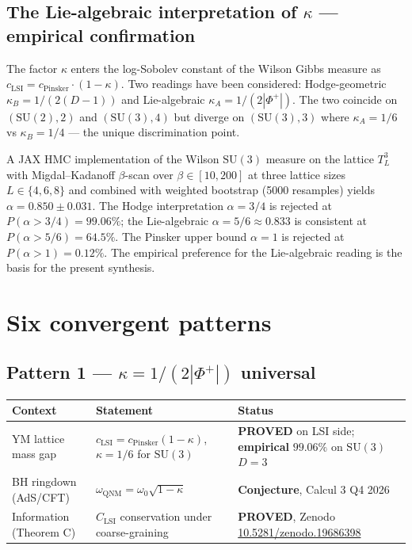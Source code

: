 \documentclass[11pt,a4paper]{article}
\newcommand{\SU}{\mathrm{SU}}
\newcommand{\Pinsker}{\mathrm{Pinsker}}
\newcommand{\LSI}{\mathrm{LSI}}
\newcommand{\QNM}{\mathrm{QNM}}
\newcommand{\Phiplus}{\Phi^{+}}
\begin{document}
\subsection{The Lie-algebraic interpretation of $\kappa$ --- empirical confirmation}

The factor $\kappa$ enters the log-Sobolev constant of the Wilson Gibbs measure as $c_{\LSI} = c_{\Pinsker} \cdot (1 - \kappa)$. Two readings have been considered: Hodge-geometric $\kappa_B = 1/(2(D-1))$ and Lie-algebraic $\kappa_A = 1/(2|\Phiplus|)$. The two coincide on $(\SU(2), 2)$ and $(\SU(3), 4)$ but diverge on $(\SU(3), 3)$ where $\kappa_A = 1/6$ vs $\kappa_B = 1/4$ --- the unique discrimination point.

A JAX HMC implementation of the Wilson $\SU(3)$ measure on the lattice $T^3_L$ with Migdal--Kadanoff $\beta$-scan over $\beta \in [10, 200]$ at three lattice sizes $L \in \{4, 6, 8\}$ and combined with weighted bootstrap (5000 resamples) yields $\alpha = 0.850 \pm 0.031$. The Hodge interpretation $\alpha = 3/4$ is rejected at $P(\alpha > 3/4) = 99.06\%$; the Lie-algebraic $\alpha = 5/6 \approx 0.833$ is consistent at $P(\alpha > 5/6) = 64.5\%$. The Pinsker upper bound $\alpha = 1$ is rejected at $P(\alpha > 1) = 0.12\%$. The empirical preference for the Lie-algebraic reading is the basis for the present synthesis.

\section{Six convergent patterns}\label{sec:patterns}

\subsection*{Pattern 1 --- $\kappa = 1/(2|\Phiplus|)$ universal}

\begin{tabularx}{\textwidth}{lXl}
\toprule
Context & Statement & Status \\
\midrule
YM lattice mass gap & $c_{\LSI} = c_{\Pinsker}(1-\kappa)$, $\kappa = 1/6$ for $\SU(3)$ & \textbf{PROVED} on LSI side; \textbf{empirical} $99.06\%$ on $\SU(3)$ $D=3$ \\
BH ringdown (AdS/CFT) & $\omega_{\QNM} = \omega_0 \sqrt{1 - \kappa}$ & \textbf{Conjecture}, Calcul 3 Q4 2026 \\
Information (Theorem C) & $C_{\LSI}$ conservation under coarse-graining & \textbf{PROVED}, Zenodo \href{https://doi.org/10.5281/zenodo.19686398}{10.5281/zenodo.19686398} \\
\bottomrule
\end{tabularx}
\end{document}
